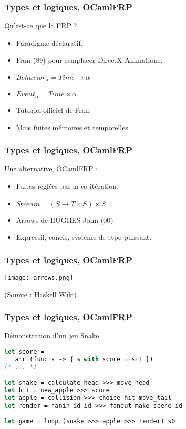 \documentclass{beamer}
\begin{document}
\begin{frame}
\frametitle{Types et logiques, OCamlFRP}

Qu'est-ce que la FRP ?

\begin{itemize}
\item Paradigme déclaratif.
\item Fran (89) pour remplacer DirectX Animations.
\item $Behavior_{\alpha} = Time \longrightarrow
      \alpha$
\item $Event_{\alpha} = Time \times \alpha$
\item Tutoriel officiel de Fran.
\item Mais fuites mémoires et temporelles.
\end{itemize}
\end{frame}

\begin{frame}
\frametitle{Types et logiques, OCamlFRP}

Une alternative, OCamlFRP :

\begin{itemize}
\item Fuites réglées par la co-itération.
\item $Stream = (S \longrightarrow T \times S)
      \times S$
\item Arrows de HUGHES John (00).
\item Expressif, concis, système de type puissant.
\end{itemize}
\end{frame}

\begin{frame}
\frametitle{Types et logiques, OCamlFRP}

\texttt{[image: arrows.png]}

(Source : Haskell Wiki)
\end{frame}

\begin{frame}[fragile]
\frametitle{Types et logiques, OCamlFRP}

Démonstration d'un jeu Snake.

\begin{lstlisting}[language=Caml]
let score =
   arr (func s -> { s with score = s+1 })
(* ... *)

let snake = calculate_head >>> move_head
let hit = new_apple >>> score
let apple = collision >>> choice hit move_tail
let render = fanin id id >>> fanout make_scene id

let game = loop (snake >>> apple >>> render) s0
\end{lstlisting}
\end{frame}
\end{document}
